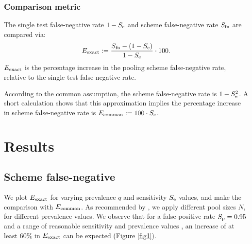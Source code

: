\documentclass{article}
\begin{document}
\subsubsection*{Comparison metric}
The single test false-negative rate $1-S_\text{e}$ and scheme false-negative
rate $S_{\text{fn}}$ are compared via:
\begin{equation}\label{eq:erel}
E_{\text{{exact}}} := \frac{S_{\text{fn}} - (1-S_\text{e})}{1-S_\text{e}} \cdot 100.
\end{equation}
$E_{\text{{exact}}}$ is the percentage increase in the pooling scheme
false-negative rate, relative to the single test false-negative rate.

According to the common assumption, the scheme false-negative rate is
$1-S_\text{e}^2$. A short calculation shows that this approximation implies
the percentage increase in scheme false-negative rate is $E_{\text{{common}}}
:= 100\cdot S_\text{e}$.

\section*{Results}\label{section:results}
\subsection*{Scheme false-negative}
We plot $E_{\text{{exact}}}$ for varying prevalence $q$ and sensitivity $S_\text{e}$
values, and make the comparison with $E_{\text{{common}}}$. As recommended by
\cite{DorfmanYuvalDor}, we apply different pool sizes $N$, for
different prevalence values. We observe that for a false-positive rate
$S_\text{p}=0.95$ \cite{DorfmanYuvalDor} and a range of reasonable
sensitivity and prevalence values \cite{KitComparison,
  InterpretingCOVID19Test, EstimatingRatesLourenco,
  FalsePositiveEstimate}, an increase of at least $60\%$ in
$E_{\text{{exact}}}$ can be expected (Figure \ref{fig1}).
\end{document}

